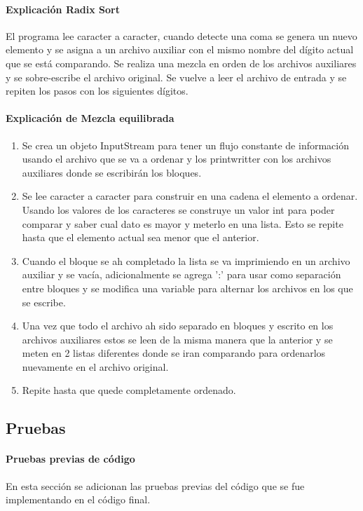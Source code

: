 \documentclass{article}
\begin{document}
	\paragraph*{Explicación Radix Sort}
	El programa lee caracter a caracter, cuando detecte una coma se genera un nuevo elemento y se asigna a un archivo auxiliar con el mismo nombre del dígito 
	actual que se está comparando. Se realiza una mezcla en orden de los archivos auxiliares y se sobre-escribe el archivo original. Se vuelve a leer el
	archivo de entrada y se repiten los pasos con los siguientes dígitos.
	
	\paragraph*{Explicación de Mezcla equilibrada}
	\begin{enumerate}
		\item Se crea un objeto InputStream para tener un flujo constante de información usando el archivo que se va a ordenar y los printwritter con los archivos auxiliares donde se escribirán los bloques.
		\item Se lee caracter a caracter para construir en una cadena el elemento a ordenar. Usando los valores de los caracteres se construye un valor int para poder comparar y saber cual dato es mayor y meterlo en una lista. Esto se repite hasta que el elemento actual sea menor que el anterior.
		\item Cuando el bloque se ah completado la lista se va imprimiendo en un archivo auxiliar y se vacía, adicionalmente se agrega ':' para usar como separación entre bloques y se modifica una variable para alternar los archivos en los que se escribe.
		\item Una vez que todo el archivo ah sido separado en bloques y escrito en los archivos auxiliares estos se leen de la misma manera que la anterior y se meten en 2 listas diferentes donde se iran comparando para ordenarlos nuevamente en el archivo original.
		\item Repite hasta que quede completamente ordenado.
		
	\end{enumerate}
	
	\subsection{Pruebas}
		\paragraph*{Pruebas previas de código}
		En esta sección se adicionan las pruebas previas del código que se fue implementando en el código final.
		
\end{document}
